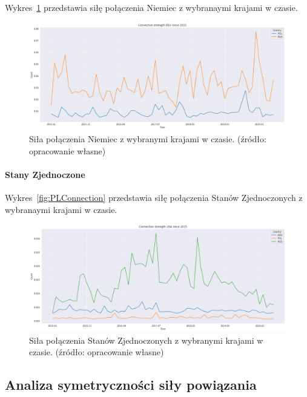 \documentclass[11pt]{report}
\begin{document}
    Wykres~\ref{fig:DEUConnection} przedstawia siłę połączenia Niemiec z wybranaymi krajami w czasie.

    \begin{figure}[ht!]
        \centering
        \includegraphics[width=1 \textwidth]{fig/DEU/DEUConnection.png}
        \caption{Siła połączenia Niemiec z wybranymi krajami w czasie. (źródło: opracowanie własne)}
        \label{fig:DEUConnection}
    \end{figure}

    \paragraph{Stany Zjednoczone}

    Wykres~\ref{fig:PLConnection} przedstawia siłę połączenia Stanów Zjednoczonych z wybranaymi krajami w czasie.

    \begin{figure}[ht!]
        \centering
        \includegraphics[width=1 \textwidth]{fig/USA/USAConnection.png}
        \caption{Siła połączenia Stanów Zjednoczonych z wybranymi krajami w czasie. (źródło: opracowanie własne)}
        \label{fig:USAConnection}
    \end{figure}

    \subsection{Analiza symetryczności siły powiązania}
\end{document}
